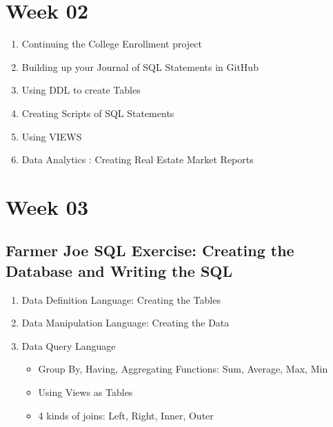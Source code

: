 \section {Week 02}
    
\begin{enumerate}
    \item Continuing the College Enrollment project
    \item Building up your Journal of SQL Statements in GitHub
     \item Using DDL to create Tables   
     \item Creating Scripts of SQL Statements   
     \item Using VIEWS
      \item Data Analytics : Creating Real Estate Market Reports
\end{enumerate}

\section {Week 03}
\subsection * {Farmer Joe SQL Exercise: Creating the Database and Writing the SQL}
\begin{enumerate}
    \item Data Definition Language: Creating the Tables
    \item Data Manipulation Language: Creating the Data
    \item Data Query Language
    \begin{itemize}
        \item Group By, Having, Aggregating Functions: Sum, Average, Max, Min 
        \item Using Views as Tables
        \item 4 kinds of joins: Left, Right, Inner, Outer
    \end{itemize} 
\end{enumerate}
    
